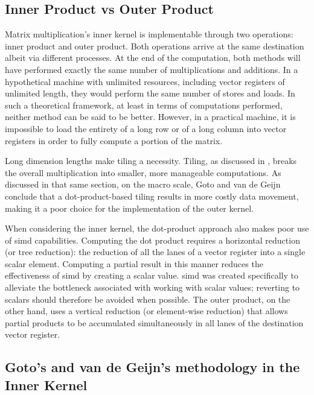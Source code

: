 \documentclass[\main/thesis.tex]{subfiles}
\begin{document}
\subsection{Inner Product vs Outer Product}
\label{sec:productsVs}
Matrix multiplication's inner kernel is implementable through two operations: inner product and outer product.
Both operations arrive at the same destination albeit via different processes.
At the end of the computation, both methods will have performed exactly the same number of multiplications and additions.
In a hypothetical machine with unlimited resources, including vector registers of unlimited length, they would perform the same number of stores and loads.
In such a theoretical framework, at least in terms of computations performed, neither method can be said to be better.
However, in a practical machine, it is impossible to load the entirety of a long row or of a long column into vector registers in order to fully compute a portion of the matrix.

Long dimension lengths make tiling a necessity.
Tiling, as discussed in , breaks the overall multiplication into smaller, more manageable computations.
As discussed in that same section, on the macro scale, Goto and van de Geijn conclude that a dot-product-based tiling results in more costly data movement, making it a poor choice for the implementation of the outer kernel.

When considering the inner kernel, the dot-product approach also makes poor use of \gls{simd} capabilities.
Computing the dot product requires a horizontal reduction (or tree reduction): the reduction of all the \glspl{lane} of a vector register into a single scalar element.
Computing a partial result in this manner reduces the effectiveness of \gls{simd} by creating a scalar value.
\Gls{simd} was created specifically to alleviate the bottleneck associated with working with scalar values; reverting to scalars should therefore be avoided when possible.
The outer product, on the other hand, uses a vertical reduction (or element-wise reduction) that allows partial products to be accumulated simultaneously in all \glspl{lane} of the destination vector register.

\subsection{Goto's and van de Geijn's  methodology in the Inner Kernel}
\label{sec:gotoInner}
\end{document}
